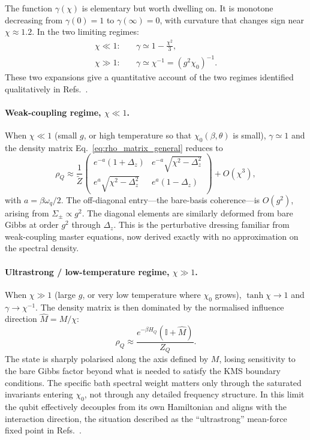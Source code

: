 The function $\gamma(\chi)$ is elementary but worth dwelling on.  It is
monotone decreasing from $\gamma(0)=1$ to $\gamma(\infty)=0$, with curvature
that changes sign near $\chi\approx 1.2$.  In the two limiting regimes:
\begin{align}
  \chi \ll 1:\quad & \gamma \simeq 1 - \tfrac{\chi^2}{3},
  \label{eq:gamma_weak}\\
  \chi \gg 1:\quad & \gamma \simeq \chi^{-1} = (g^2\chi_0)^{-1}.
  \label{eq:gamma_strong}
\end{align}
These two expansions give a quantitative account of the two regimes identified
qualitatively in Refs.~\cite{cresserWeakUltrastrongCoupling2021a,hovhannisyanHamiltonianMeanForce2020}.

\paragraph{Weak-coupling regime, $\chi\ll 1$.}

When $\chi\ll 1$ (small $g$, or high temperature so that $\chi_0(\beta,\theta)$
is small), $\gamma\simeq 1$ and the density matrix
Eq.~\eqref{eq:rho_matrix_general} reduces to
\begin{equation}
  \rho_Q \approx \frac{1}{\tilde Z}\begin{pmatrix}
    e^{-a}(1+\Delta_z) & e^{-a}\sqrt{\chi^2-\Delta_z^2}\\
    e^{a}\sqrt{\chi^2-\Delta_z^2} & e^{a}(1-\Delta_z)
  \end{pmatrix} + O(\chi^3),
\end{equation}
with $a=\beta\omega_q/2$.  The off-diagonal entry---the bare-basis coherence---is
$O(g^2)$, arising from $\Sigma_\pm\propto g^2$.  The diagonal elements are
similarly deformed from bare Gibbs at order $g^2$ through $\Delta_z$.  This is
the perturbative dressing familiar from weak-coupling master equations, now
derived exactly with no approximation on the spectral density.

\paragraph{Ultrastrong / low-temperature regime, $\chi\gg 1$.}

When $\chi\gg 1$ (large $g$, or very low temperature where $\chi_0$ grows),
$\tanh\chi\to 1$ and $\gamma\to\chi^{-1}$.  The density matrix is then
dominated by the normalised influence direction $\hat{M}=M/\chi$:
\begin{equation}
  \rho_Q \approx \frac{e^{-\beta H_Q}\!\left(\mathbb{I} + \hat{M}\right)}{Z_Q}.
\end{equation}
The state is sharply polarised along the axis defined by $M$, losing
sensitivity to the bare Gibbs factor beyond what is needed to satisfy the KMS
boundary conditions.  The specific bath spectral weight matters only through the
saturated invariants entering $\chi_0$, not through any detailed frequency
structure.  In this limit the qubit effectively decouples from its own
Hamiltonian and aligns with the interaction direction, the situation described
as the ``ultrastrong'' mean-force fixed point in
Refs.~\cite{cresserWeakUltrastrongCoupling2021a,hovhannisyanHamiltonianMeanForce2020}.

